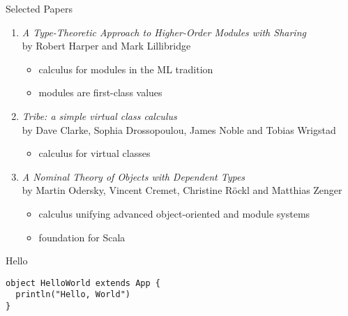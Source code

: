 \documentclass{beamer}
\begin{document}
\begin{frame}{Selected Papers}
\begin{enumerate}
\item {\it A Type-Theoretic Approach to Higher-Order
  Modules with Sharing}\\{\footnotesize by Robert Harper and Mark
  Lillibridge}\begin{itemize}
\item calculus for modules in the ML tradition
\item modules are first-class values
\end{itemize}
\item {\it Tribe: a simple virtual class calculus}\\
  {\footnotesize by Dave Clarke, Sophia Drossopoulou, James Noble and Tobias
  Wrigstad}\begin{itemize}
\item calculus for virtual classes
\end{itemize}
\item {\it A Nominal Theory of Objects with Dependent
  Types}\\{\footnotesize by Martin Odersky, Vincent Cremet, Christine R{\"o}ckl and
  Matthias Zenger}\begin{itemize}
\item calculus unifying advanced object-oriented and module systems
\item foundation for Scala
\end{itemize}
\end{enumerate}
\end{frame}

\begin{frame}[fragile]{Hello}
\begin{verbatim}
object HelloWorld extends App {
  println("Hello, World")
}
\end{verbatim}
\end{frame}
\end{document}
